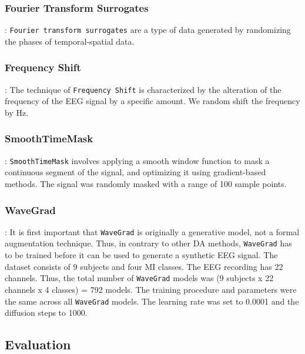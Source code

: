 \documentclass[runningheads]{llncs}
\begin{document}
\subsubsection{Fourier Transform Surrogates}:
\texttt{Fourier transform surrogates} are a type of data generated by randomizing the phases of temporal-spatial data.


\subsubsection{Frequency Shift}: The technique of \texttt{Frequency Shift} is characterized by the alteration of the frequency of the EEG signal by a specific amount.
We random shift the frequency by  Hz.


\subsubsection{SmoothTimeMask}:
\texttt{SmoothTimeMask} involves applying a smooth window function to mask a continuous segment of the signal, and optimizing it using gradient-based methods. The signal was randomly masked with a range of 100 sample points.

\subsubsection{WaveGrad}:
It is first important that \texttt{WaveGrad} is originally a generative model, not a formal augmentation technique.  Thus, in contrary to other DA methods, \texttt{WaveGrad} has to be trained before it can be used to generate a synthetic EEG signal.   The dataset consists of 9 subjects and four MI classes. The EEG recording has 22 channels. Thus, the total number of \texttt{WaveGrad} models was (9 subjects x 22 channels x 4 classes) = 792 models.  The training procedure and parameters were the same across all \texttt{WaveGrad} models. The learning rate was set to 0.0001 and the diffusion steps to 1000.

\subsection{Evaluation}
\end{document}
